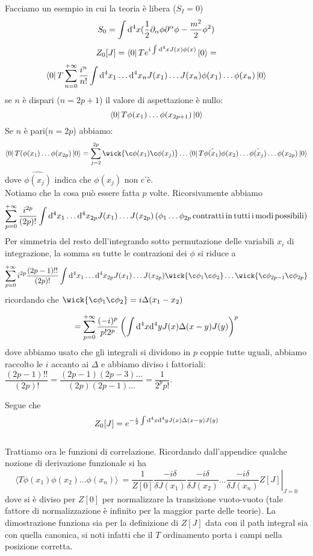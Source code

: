 \documentclass[a4paper, 11pt]{article}
\begin{document}
	Facciamo un esempio	in cui la teoria è libera ($S_I=0$)
	\[S_0 = \int \mathrm{d}^4 x (\frac{1}{2} \partial_\alpha \phi \partial^\alpha \phi - \frac{m^2}{2}\phi^2)\]
	\[Z_0[J]=\left\langle 0\right|Te^{i\int \mathrm{d}^4 x J(x)\phi(x)}\left| 0\right\rangle = \]
	\[\left\langle 0\right|T\sum_{n=0}^{+\infty} \frac{i^n}{n!}\int \mathrm{d}^4x_1 \dots \mathrm{d}^4 x_n J(x_1)\dots J(x_n) \phi(x_1)\dots \phi(x_n)\left| 0\right\rangle\]
	se $n$ è dispari ($n=2p+1$) il valore di aspettazione è nullo:
	\[\left\langle 0\right|T\phi(x_1)\dots \phi(x_{2p+1})\left| 0\right\rangle\]
	Se $n$ è pari($n=2p$) abbiamo:
	\[\bra{0}T(\phi(x_1)\dots\phi(x_{2p})\ket{0} = \sum_{j=2}^{2p}\wick{\c\phi(x_1) \c\phi(x_j)} \dots \bra{0}T\hat {\phi(x_1)} \phi(x_2) \dots \hat{\phi(x_j)}\dots \phi(x_{2p})\ket{0}\]
	dove $\hat {\phi(x_j)}$ indica che $\phi(x_j)$ non c'è.\\
	Notiamo che la cosa può essere fatta $p$ volte. Ricorsivamente abbiamo
	\[ \sum_{p=0}^{+\infty} \frac{i^{2p}}{(2p)!}\int \mathrm{d}^4x_1 \dots \mathrm{d}^4 x_{2p} J(x_1)\dots J(x_{2p}) \left(\phi_1\dots\phi_{2p}\, \mathrm{contratti\, in\, tutti\, i\, modi\, possibili}\right)\]
	Per simmetria del resto dell'integrando sotto permutazione delle variabili $x_i$ di integrazione, la somma su tutte le contrazioni dei $\phi$ si riduce a
	\[ \sum_{p=0}^{+\infty} i^{2p}\frac{(2p-1)!!}{(2p)!}\int \d^4x_1 \dots \d^4 x_{2p} J(x_1)\dots J(x_{2p}) \wick{\c \phi_1 \c \phi_2} \dots \wick{\c \phi_{2p-1} \c \phi_{2p}} \]
	ricordando che $\wick{\c \phi_1 \c \phi_2} = i \Delta(x_1-x_2)$
	
	\[= \sum_{p=0}^{+\infty} \frac{(-i)^p}{p!2^p} \left( \int \mathrm{d}^4 x \mathrm{d}^4 y J(x)\Delta(x-y)J(y)\right)^p\]
	dove abbiamo usato che gli integrali si dividono in $p$ coppie tutte uguali, abbiamo raccolto le $i$ accanto ai $\Delta$ e abbiamo diviso i fattoriali: $\dfrac{(2p-1)!!}{(2p)!} = \dfrac{(2p-1)(2p-3)\dots}{(2p)(2p-1)\dots} = \dfrac{1}{2^p p!}$.

	Segue che
	\[Z_0[J] = e^{-\frac{i}{2}\int \mathrm{d}^4 x \mathrm{d}^4 y J(x)\Delta(x-y)J(y)} \]
	\\
	
	Trattiamo ora le funzioni di correlazione. Ricordando dall'appendice qualche nozione di derivazione funzionale si ha
	\[ \langle T\phi(x_1)\phi(x_2)\dots \phi(x_n)\rangle\ = \left. \frac{1}{Z[0]}{\frac{-i\delta}{\delta J(x_1)}\frac{-i\delta}{\delta J(x_2)}\dots \frac{-i\delta}{\delta J(x_n)}}Z[J] \right|_{J=0} \]
	dove si è diviso per $Z[0]$ per normalizzare la transizione vuoto-vuoto (tale fattore di normalizzazione è infinito per la maggior parte delle teorie). La dimostrazione funziona sia per la definizione di $Z[J]$ data con il path integral sia con quella canonica, si noti infatti che il $T$ ordinamento porta i campi nella posizione corretta.
\end{document}
